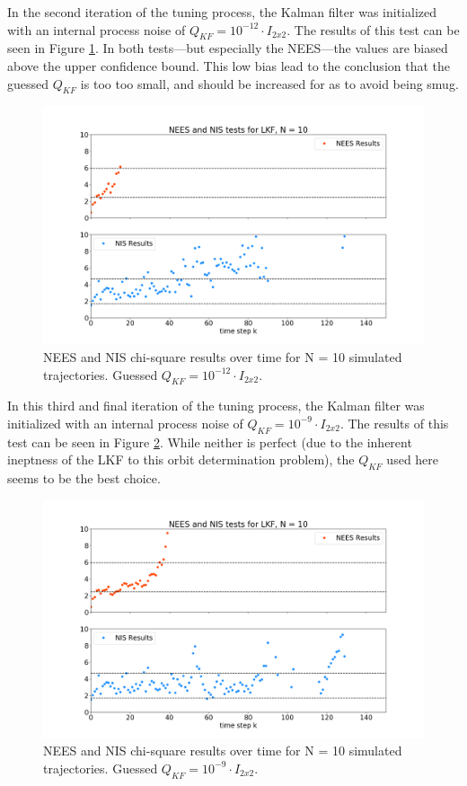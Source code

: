 \documentclass[11pt, a4paper]{article}
\begin{document}
In the second iteration of the tuning process, the Kalman filter was initialized with an internal process noise of $Q_{KF} = 10^{-12} \cdot I_{2 x 2}$. 
The results of this test can be seen in Figure \ref{fig:neesnis_lkf_Qsmall}. 
In both tests---but especially the NEES---the values are biased above the upper confidence bound. 
This low bias lead to the conclusion that the guessed $Q_{KF}$ is too too small, and should be increased for as to avoid being smug. 
\begin{figure}[H]
	\centering
	\includegraphics[width=\textwidth]{Figures/NEESNIS_lkf_N10Q1.0E-12.png}
	\caption{NEES and NIS chi-square results over time for N = 10 simulated trajectories. Guessed $Q_{KF} = 10^{-12} \cdot I_{2 x 2}$.}
	\label{fig:neesnis_lkf_Qsmall}
\end{figure}

In this third and final iteration of the tuning process, the Kalman filter was initialized with an internal process noise of $Q_{KF} = 10^{-9} \cdot I_{2 x 2}$. 
The results of this test can be seen in Figure \ref{fig:neesnis_lkf}.
While neither is perfect (due to the inherent ineptness of the LKF to this orbit determination problem), the $Q_{KF}$ used here seems to be the best choice. 

\begin{figure}[H]
	\centering
	\includegraphics[width=\textwidth]{Figures/NEESNIS_lkf_N10Q1.0E-09.png}
	\caption{NEES and NIS chi-square results over time for N = 10 simulated trajectories. Guessed $Q_{KF} = 10^{-9} \cdot I_{2 x 2}$.}
	\label{fig:neesnis_lkf}
\end{figure}
\end{document}
